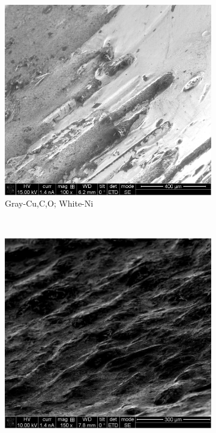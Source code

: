 \documentclass[]{article}
\begin{document}
\begin{figure}[h]
	\centering
	\begin{subfigure}[h]{0.32\textwidth}
		\includegraphics[width=\textwidth]{Photos/SEM_01}
		\caption{Gray-Cu,C,O; White-Ni}
	\end{subfigure}
	~
	\begin{subfigure}[h]{0.32\textwidth}
		\includegraphics[width=\textwidth]{Photos/SEM_rough}

\end{subfigure}
\end{figure}
\end{document}
